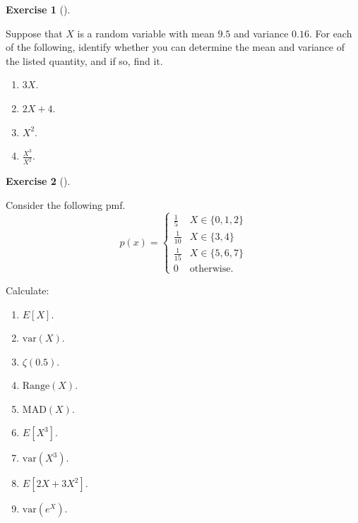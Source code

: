 \documentclass[
  letterpaper,
  DIV=11,
  numbers=noendperiod]{scrreprt}
\providecommand{\tightlist}{%
  \setlength{\itemsep}{0pt}\setlength{\parskip}{0pt}}\usepackage{longtable,booktabs,array}
\theoremstyle{definition}
\newtheorem{exercise}{Exercise}[chapter]
\theoremstyle{definition}
\theoremstyle{definition}
\theoremstyle{remark}
\begin{document}
\begin{exercise}[]\protect\hypertarget{exr-6.3}{}\label{exr-6.3}

Suppose that \(X\) is a random variable with mean \(9.5\) and variance
\(0.16\). For each of the following, identify whether you can determine
the mean and variance of the listed quantity, and if so, find it.

\begin{enumerate}
\def\labelenumi{\alph{enumi}.}
\tightlist
\item
  \(3X\).
\item
  \(2X + 4\).
\item
  \(X^2\).
\item
  \(\frac{X^3}{X^2}\).
\end{enumerate}

\end{exercise}

\begin{exercise}[]\protect\hypertarget{exr-6.4}{}\label{exr-6.4}

Consider the following pmf. \[
p(x) = \begin{cases}
        \frac{1}{5} & X \in \{0, 1, 2\} \\
        \frac{1}{10} & X \in \{3, 4\} \\
        \frac{1}{15} & X \in \{5, 6, 7\} \\
        0 & \text{otherwise}.
    \end{cases}
\]

Calculate:

\begin{enumerate}
\def\labelenumi{\alph{enumi}.}
\tightlist
\item
  \(E[X]\).
\item
  \(\text{var}(X)\).
\item
  \(\zeta(0.5)\).
\item
  \(\text{Range}(X)\).
\item
  \(\text{MAD}(X)\).
\item
  \(E[X^3]\).
\item
  \(\text{var}(X^3)\).
\item
  \(E[2X + 3X^2]\).
\item
  \(\text{var}(e^X)\).
\end{enumerate}

\end{exercise}
\end{document}
